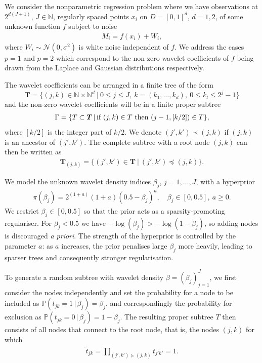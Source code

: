 \documentclass[11pt,a4paper]{article}
\newcommand{\g}{{\, |\,}}
\newcommand{\Pp}{{\mathbb P}}
\newcommand{\wt}{{\widetilde t}}
\newcommand{\Nn}{{\mathcal N}}
\newcommand{\oT}{\boldsymbol{T}}
\newcommand{\N}{\mathbb{N}}
\begin{document}
We consider the nonparametric regression problem where
we have observations at $2^{d(J+1)}$, $J\in\N$, regularly spaced points $x_i$ on $D=[0,1]^d$, $d=1,2$, of some unknown function $f$ subject to noise
\begin{align}\label{eq:DenoisingMain}
    M_i=f(x_i)+W_i,
\end{align}
where $W_i\sim \Nn(0,\sigma^2)$ is white noise independent of $f$. We address the cases $p=1$ and $p=2$ which correspond to the non-zero wavelet coefficients of $f$ being drawn from the Laplace and Gaussian distributions respectively. 

The wavelet coefficients can be arranged in a finite tree of the form
\begin{equation*}
\oT=\{(j,k)\in \N\times \N^d\ |\ 0\le j\le J,\ k=(k_1,\dots,k_d),\ 0\leq k_l\leq 2^j-1\}
\end{equation*}
and the non-zero wavelet coefficients will be in a finite proper subtree
\begin{align*}
\Gamma=\{T\subset\oT\,|\,
\hbox{if $(j,k)\in T$ then $(j-1,[k/2])\in T$}\},
\end{align*}
where $[k/2]$ is the integer part of $k/2$. 
We denote $(j',k')\prec(j,k)$ if $(j,k)$ is an ancestor of $(j',k')$.
The complete subtree with a root node $(j,k)$ can then be written as
\begin{align*}
\oT_{(j,k)} =\{(j',k')\in \oT\ |\ (j',k')\preceq (j,k)\}.
\end{align*}

We model the unknown wavelet density indices $\beta_j$, $j=1,\dots,J$, with a hyperprior
\begin{align*}
\pi(\beta_j)=2^{(1+a)}(1+a)(0.5-\beta_j)^a, 
\quad \beta_j\in[0,0.5],\ a\geq0.  
\end{align*}
We restrict $\beta_j\in [0,0.5]$ so that the prior acts as a sparsity-promoting regulariser. For $\beta_j<0.5$ we have $-\log(\beta_j)>-\log(1-\beta_j)$, so adding nodes is discouraged \textit{a priori}. The strength of the hyperprior is controlled by the parameter $a$: as $a$ increases, the prior penalises large $\beta_j$ more heavily, leading to sparser trees and consequently stronger regularisation. 


To generate a random subtree with wavelet density $\beta=(\beta_j)_{j=1}^J$, we first consider the nodes independently and set the probability for a node to be included as $\Pp(t_{jk}=1 \g \beta_j)=\beta_j$, and correspondingly the probability for exclusion as $\Pp(t_{jk}=0 \g \beta_j)=1-\beta_j$. 
The resulting proper subtree $T$ then consists of all nodes that connect to the root node, that is, the nodes $(j,k)$ for which
\begin{align*}
\wt_{jk}=\prod_{(j',k')\succeq(j,k)}t_{j'k'} =1.
\end{align*}
\end{document}
